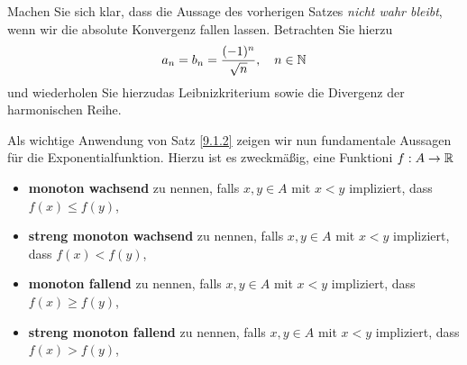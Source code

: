 \begin{task}
	Machen Sie sich klar, dass die Aussage des vorherigen Satzes \textit{nicht wahr bleibt}, wenn wir die absolute Konvergenz fallen lassen. Betrachten Sie hierzu
	\[
		a_n = b_n = \frac{ (-1)^n }{ \sqrt{n}  } , \quad n \in \mathbb{N} 
	\]
	und wiederholen Sie hierzudas Leibnizkriterium sowie die Divergenz der harmonischen Reihe.
\end{task}
Als wichtige Anwendung von Satz \ref{9.1.2} zeigen wir nun fundamentale Aussagen für die Exponentialfunktion. Hierzu ist es zweckmäßig, eine Funktioni $ f: A\to \mathbb{R}  $ 
\begin{itemize}
	\item \textbf{monoton wachsend} zu nennen, falls $ x, y \in A $ mit $ x < y $ impliziert, dass $ f(x) \leq f(y) $,
	\item \textbf{streng monoton wachsend} zu nennen, falls $ x, y \in A $ mit $ x < y $ impliziert, dass $ f(x) < f(y) $,
	\item \textbf{monoton fallend} zu nennen, falls $ x, y \in A $ mit $ x < y $ impliziert, dass $ f(x) \geq  f(y) $,
	\item \textbf{streng monoton fallend} zu nennen, falls $ x, y \in A $ mit $ x < y $ impliziert, dass $ f(x) > f(y) $,
\end{itemize}

